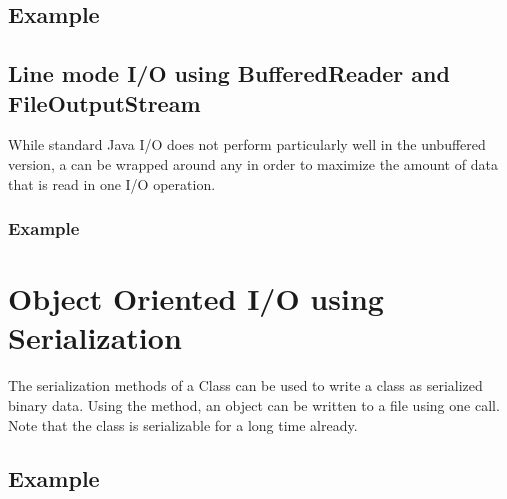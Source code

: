 {  \subsection{Example}
  
  \subsection{Line mode I/O using BufferedReader and FileOutputStream}
  While standard Java I/O does not perform particularly well in the
  unbuffered version, a  can be wrapped around
  any  in order to maximize the amount of data that is
  read in one I/O operation.
  \subsubsection{Example}


\section{Object Oriented I/O using Serialization}
The serialization methods of a Class can be used to write a class as
serialized binary data. Using the  method, an
object can be written to a file using one call. Note that the \Rexx{}
class is serializable for a long time already.
\subsection{Example}




}
